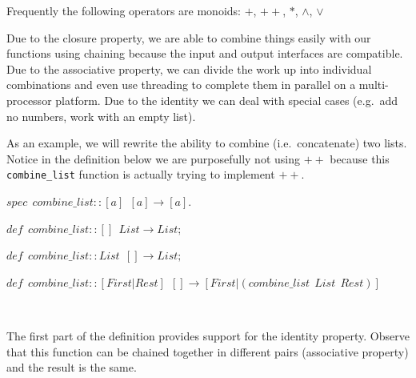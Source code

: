 \documentclass[
]{book}
\begin{document}
Frequently the following operators are monoids: \(+\), \(++\), \(*\), \(\land\), \(\lor\)

Due to the closure property, we are able to combine things easily with our functions using chaining because the input and output interfaces are compatible. Due to the associative property, we can divide the work up into individual combinations and even use threading to complete them in parallel on a multi-processor platform. Due to the identity we can deal with special cases (e.g.~add no numbers, work with an empty list).

As an example, we will rewrite the ability to combine (i.e.~concatenate) two lists. Notice in the definition below we are purposefully not using \(++\) because this \texttt{combine\_list} function is actually trying to implement \(++\).

\begin{formulabox}
\(spec ~ ~ combine\_list :: [a] ~ ~ [a] \rightarrow [a].\)

\(de\mathit{f} ~ ~ combine\_list :: []~ ~ List \rightarrow List;\)

\(de\mathit{f} ~ ~ combine\_list :: List ~ ~ [] \rightarrow List;\)

\(de\mathit{f} ~ ~ combine\_list :: [First|Rest] ~ ~ [] \rightarrow [First | (combine\_list ~ ~ List ~ ~ Rest)]\)

\end{formulabox}

\(\nonumber\)

The first part of the definition provides support for the identity property. Observe that this function can be chained together in different pairs (associative property) and the result is the same.
\end{document}
